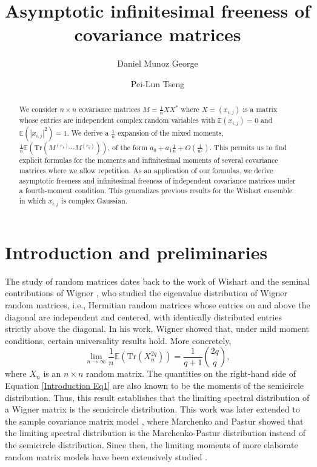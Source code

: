 \documentclass{article}
\title{Asymptotic infinitesimal freeness of  covariance matrices}
\author[1]{Daniel Munoz George}
\author[2]{Pei-Lun Tseng}
\affil[1]{Tecnol\'ogico de Monterrey, School of Engineering and Sciences,
Guadalajara, Mexico}
\affil[2]{Department of Applied Mathematics,
Chung Yuan Christian University,
Taoyuan, Taiwan}
\affil[ ]{\texttt{dmunozgeorge@gmail.com}}
\affil[ ]{\texttt{pltseng@cycu.edu.tw}}
\theoremstyle{definition}
\newcommand{\Tr}{\text{Tr}}
\begin{document}
\maketitle

\begin{abstract}
We consider $n\times n$ covariance matrices $M=\frac{1}{n}XX^*$ where $X=(x_{i,j})$ is a matrix whose entries are independent complex random variables with $\mathbb{E}(x_{i,j})=0$ and $\mathbb{E}(|x_{i,j}|^2)=1$. We derive a $\frac{1}{n}$ expansion of the mixed moments, $\frac{1}{n}\mathbb{E}(\Tr(M^{(r_1)}\cdots M^{(r_q)}))$, of the form $a_0+a_1\frac{1}{n}+O(\frac{1}{n^2})$. This permits us to find explicit formulas for the moments and infinitesimal moments of several covariance matrices where we allow repetition. As an application of our formulas, we derive asymptotic freeness and infinitesimal freeness of independent covariance matrices under a fourth-moment condition. This generalizes previous results for the Wishart ensemble in which $x_{i,j}$ is complex Gaussian.
\end{abstract}

\renewcommand{\contentsname}{Outline}

\tableofcontents
\bigskip


\section{Introduction and preliminaries}

The study of random matrices dates back to the work of Wishart and the seminal contributions of Wigner \cite{W1,W2}, who studied the eigenvalue distribution of Wigner random matrices, i.e., Hermitian random matrices whose entries on and above the diagonal
are independent and centered, with identically distributed entries
strictly above the diagonal. In his work, Wigner showed that, under mild moment conditions, certain universality results hold. More concretely,
\begin{equation}\label{Introduction Eq1}
\lim_{n\rightarrow\infty} \frac{1}{n}\mathbb{E}\left(\Tr(X_n^{2q})\right)
=\frac{1}{q+1}\binom{2q}{q},
\end{equation}
where $X_n$ is an $n\times n$ random matrix. The quantities on the right-hand side of Equation \ref{Introduction Eq1} are also known to be the moments of the semicircle distribution. Thus, this result establishes that the limiting spectral distribution of a Wigner matrix is the semicircle distribution. This work was later extended to the sample covariance matrix model \cite{MP}, where Marchenko and Pastur showed that the limiting spectral distribution is the Marchenko-Pastur distribution instead of the semicircle distribution. Since then, the limiting moments of more elaborate random matrix models have been extensively studied \cite{EKYY,TVW,JL,DE,BX,GWZ,BP}. 
\end{document}
